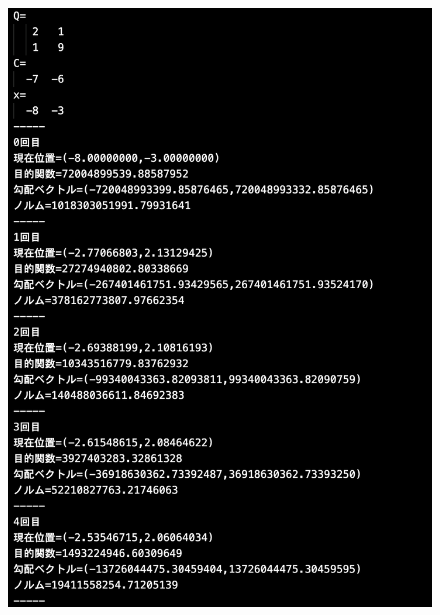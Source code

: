 \documentclass[12pt]{jarticle}
\begin{document}
\begin{figure}[h]
    \begin{minipage}{0.5\hsize}
        \begin{center}
            \includegraphics[scale=0.2]{kadai1_1n_out3_1_1.png}
        \end{center}
    \end{minipage}
    \begin{minipage}{0.5\hsize}
        \begin{center}

\end{center}
\end{minipage}
\end{figure}
\end{document}
